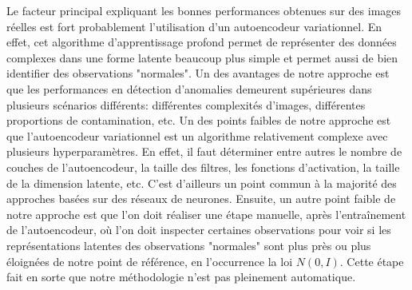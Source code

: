  Le facteur principal expliquant les bonnes performances obtenues sur des images réelles est fort probablement l'utilisation d'un autoencodeur variationnel. En effet, cet algorithme d'apprentissage profond permet de représenter des données complexes dans une forme latente beaucoup plus simple et permet aussi de bien identifier des observations "normales". Un des avantages de notre approche est que les performances en détection d'anomalies demeurent supérieures dans plusieurs scénarios différents: différentes complexités d'images, différentes proportions de contamination, etc. Un des points faibles de notre approche est que l'autoencodeur variationnel est un algorithme relativement complexe avec plusieurs hyperparamètres. En effet, il faut déterminer entre autres le nombre de couches de l'autoencodeur, la taille des filtres, les fonctions d'activation, la taille de la dimension latente, etc. C'est d'ailleurs un point commun à la majorité des approches basées sur des réseaux de neurones. Ensuite, un autre point faible de notre approche est que l'on doit réaliser une étape manuelle, après l'entraînement de l'autoencodeur, où l'on doit inspecter certaines observations pour voir si les représentations latentes des observations "normales" sont plus près ou plus éloignées de notre point de référence, en l'occurrence la loi $N(0,I)$. Cette étape fait en sorte que notre méthodologie n'est pas pleinement automatique.

